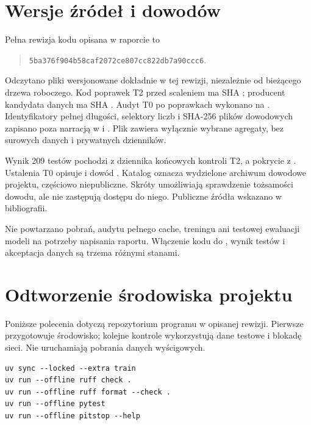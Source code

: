 \label{ch:repro}

\section{Wersje źródeł i dowodów}

Pełna rewizja kodu opisana w raporcie to
\begin{quote}\small
\nolinkurl{5ba376f904b58caf2072ce807cc822db7a90ccc6}.
\end{quote}
Odczytano pliki wersjonowane dokładnie w tej rewizji, niezależnie od
bieżącego drzewa roboczego. Kod poprawek T2 przed scaleniem ma SHA
; producent kandydata danych ma SHA .
Audyt T0 po poprawkach wykonano na .
Identyfikatory pełnej długości, selektory liczb i SHA-256 plików dowodowych
zapisano poza narracją w  i
. Plik 
zawiera wyłącznie wybrane agregaty, bez surowych danych i prywatnych
dzienników.

Wynik 209 testów pochodzi z dziennika końcowych kontroli T2,
a pokrycie z .
Ustalenia T0 opisuje  i dowód
.
Katalog  oznacza wydzielone archiwum dowodowe projektu,
częściowo niepubliczne. Skróty umożliwiają sprawdzenie tożsamości dowodu,
ale nie zastępują dostępu do niego. Publiczne źródła wskazano w bibliografii.

Nie powtarzano pobrań, audytu pełnego cache, treningu ani testowej
ewaluacji modeli na potrzeby napisania raportu. Włączenie kodu do
, wynik testów i akceptacja danych są trzema różnymi stanami.

\section{Odtworzenie środowiska projektu}

Poniższe polecenia dotyczą repozytorium programu w opisanej rewizji.
Pierwsze przygotowuje środowisko; kolejne kontrole wykorzystują dane
testowe i blokadę sieci. Nie uruchamiają pobrania danych wyścigowych.

\begin{lstlisting}
uv sync --locked --extra train
uv run --offline ruff check .
uv run --offline ruff format --check .
uv run --offline pytest
uv run --offline pitstop --help
\end{lstlisting}

